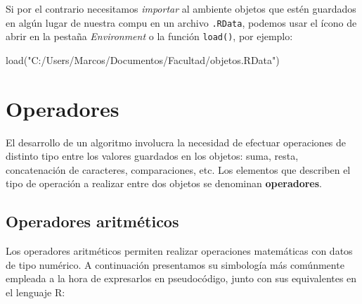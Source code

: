 \documentclass[
]{book}
\newenvironment{Shaded}{\begin{snugshade}}{\end{snugshade}}
\newcommand{\FunctionTok}[1]{\textcolor[rgb]{0.00,0.00,0.00}{#1}}
\newcommand{\NormalTok}[1]{#1}
\newcommand{\StringTok}[1]{\textcolor[rgb]{0.31,0.60,0.02}{#1}}
\begin{document}
Si por el contrario necesitamos \emph{importar} al ambiente objetos que estén guardados en algún lugar de nuestra compu en un archivo \texttt{.RData}, podemos usar el ícono de abrir en la pestaña \emph{Environment} o la función \texttt{load()}, por ejemplo:

\begin{Shaded}
\begin{Highlighting}[]
\FunctionTok{load}\NormalTok{(}\StringTok{"C:/Users/Marcos/Documentos/Facultad/objetos.RData"}\NormalTok{)}
\end{Highlighting}
\end{Shaded}

\hypertarget{operadores}{%
\section{Operadores}\label{operadores}}

El desarrollo de un algoritmo involucra la necesidad de efectuar operaciones de distinto tipo entre los valores guardados en los objetos: suma, resta, concatenación de caracteres, comparaciones, etc. Los elementos que describen el tipo de operación a realizar entre dos objetos se denominan \textbf{operadores}.

\hypertarget{operadores-aritmuxe9ticos}{%
\subsection{Operadores aritméticos}\label{operadores-aritmuxe9ticos}}

Los operadores aritméticos permiten realizar operaciones matemáticas con datos de tipo numérico. A continuación presentamos su simbología más comúnmente empleada a la hora de expresarlos en pseudocódigo, junto con sus equivalentes en el lenguaje R:
\end{document}

